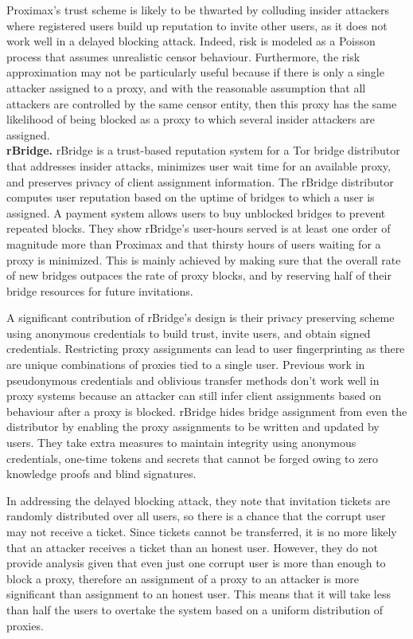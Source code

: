 Proximax's trust scheme is likely to be thwarted by colluding insider attackers where registered users build up reputation to invite other users, as it does not work well in a delayed blocking attack. Indeed, risk is modeled as a Poisson process that assumes unrealistic censor behaviour. Furthermore, the risk approximation may not be particularly useful because if there is only a single attacker assigned to a proxy, and with the reasonable assumption that all attackers are controlled by the same censor entity, then this proxy has the same likelihood of being blocked as a proxy to which several insider attackers are assigned. \\

\textbf{rBridge.} rBridge \cite{wang2013rbridge} is a trust-based reputation system for a Tor bridge distributor that addresses insider attacks, minimizes user wait time for an available proxy, and preserves privacy of client assignment information. The rBridge distributor computes user reputation based on the uptime of bridges to which a user is assigned. A payment system allows users to buy unblocked bridges to prevent repeated blocks. They show rBridge's user-hours served is at least one order of magnitude more than Proximax and that thirsty hours of users waiting for a proxy is minimized. This is mainly achieved by making sure that the overall rate of new bridges outpaces the rate of proxy blocks, and by reserving half of their bridge resources for future invitations.


A significant contribution of rBridge's design is their privacy preserving scheme using anonymous credentials to build trust, invite users, and obtain signed credentials. Restricting proxy assignments can lead to user fingerprinting as there are unique combinations of proxies tied to a single user. Previous work in pseudonymous credentials and oblivious transfer methods don't work well in proxy systems because an attacker can still infer client assignments based on behaviour after a proxy is blocked. rBridge hides bridge assignment from even the distributor by enabling the proxy assignments to be written and updated by users. They take extra measures to maintain integrity using anonymous credentials, one-time tokens and secrets that cannot be forged owing to zero knowledge proofs and blind signatures. 

In addressing the delayed blocking attack, they note that invitation tickets are randomly distributed over all users, so there is a chance that the corrupt user may not receive a ticket. Since tickets cannot be transferred, it is no more likely that an attacker receives a ticket than an honest user. However, they do not provide analysis given that even just one corrupt user is more than enough to block a proxy, therefore an assignment of a proxy to an attacker is more significant than assignment to an honest user. This means that it will take less than half the users to overtake the system based on a uniform distribution of proxies. \\


